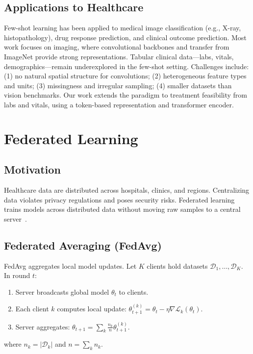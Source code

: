 \subsection{Applications to Healthcare}

Few-shot learning has been applied to medical image classification (e.g., X-ray, histopathology), drug response prediction, and clinical outcome prediction. Most work focuses on imaging, where convolutional backbones and transfer from ImageNet provide strong representations. Tabular clinical data---labs, vitals, demographics---remain underexplored in the few-shot setting. Challenges include: (1) no natural spatial structure for convolutions; (2) heterogeneous feature types and units; (3) missingness and irregular sampling; (4) smaller datasets than vision benchmarks. Our work extends the paradigm to treatment feasibility from labs and vitals, using a token-based representation and transformer encoder.

\section{Federated Learning}

\subsection{Motivation}

Healthcare data are distributed across hospitals, clinics, and regions. Centralizing data violates privacy regulations and poses security risks. Federated learning trains models across distributed data without moving raw samples to a central server~\cite{mcmahan2017communication}.

\subsection{Federated Averaging (FedAvg)}

FedAvg aggregates local model updates. Let $K$ clients hold datasets $\mathcal{D}_1, \ldots, \mathcal{D}_K$. In round $t$:
\begin{enumerate}
\item Server broadcasts global model $\theta_t$ to clients.
\item Each client $k$ computes local update: $\theta_{t+1}^{(k)} = \theta_t - \eta \nabla \mathcal{L}_k(\theta_t)$.
\item Server aggregates: $\theta_{t+1} = \sum_k \frac{n_k}{n} \theta_{t+1}^{(k)}$.
\end{enumerate}
where $n_k = |\mathcal{D}_k|$ and $n = \sum_k n_k$.

